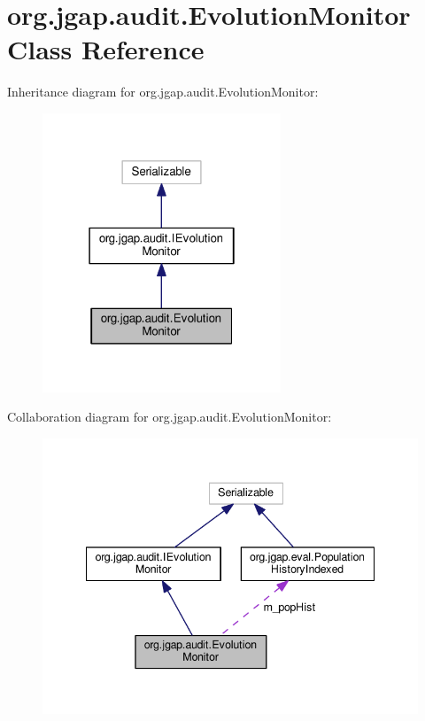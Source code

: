 \hypertarget{classorg_1_1jgap_1_1audit_1_1_evolution_monitor}{\section{org.\-jgap.\-audit.\-Evolution\-Monitor Class Reference}
\label{classorg_1_1jgap_1_1audit_1_1_evolution_monitor}
}


Inheritance diagram for org.\-jgap.\-audit.\-Evolution\-Monitor\-:
\nopagebreak
\begin{figure}[H]
\begin{center}
\leavevmode
\includegraphics[width=202pt]{classorg_1_1jgap_1_1audit_1_1_evolution_monitor__inherit__graph}
\end{center}
\end{figure}


Collaboration diagram for org.\-jgap.\-audit.\-Evolution\-Monitor\-:
\nopagebreak
\begin{figure}[H]
\begin{center}
\leavevmode
\includegraphics[width=341pt]{classorg_1_1jgap_1_1audit_1_1_evolution_monitor__coll__graph}
\end{center}
\end{figure}
